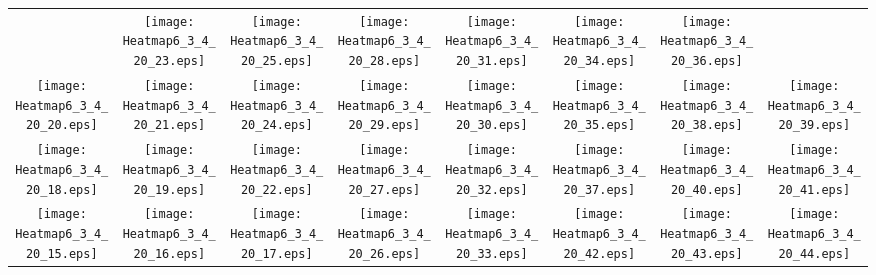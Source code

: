 \documentclass{standalone}
\begin{document}
\renewcommand{\arraystretch}{0}
\setlength{\tabcolsep}{0pt}
\begin{tabular}{ *8{c} }
 & \texttt{[image: Heatmap6\_3\_4\_20\_23.eps]} & \texttt{[image: Heatmap6\_3\_4\_20\_25.eps]} & \texttt{[image: Heatmap6\_3\_4\_20\_28.eps]} & \texttt{[image: Heatmap6\_3\_4\_20\_31.eps]} & \texttt{[image: Heatmap6\_3\_4\_20\_34.eps]} & \texttt{[image: Heatmap6\_3\_4\_20\_36.eps]} &  \\
\texttt{[image: Heatmap6\_3\_4\_20\_20.eps]} & \texttt{[image: Heatmap6\_3\_4\_20\_21.eps]} & \texttt{[image: Heatmap6\_3\_4\_20\_24.eps]} & \texttt{[image: Heatmap6\_3\_4\_20\_29.eps]} & \texttt{[image: Heatmap6\_3\_4\_20\_30.eps]} & \texttt{[image: Heatmap6\_3\_4\_20\_35.eps]} & \texttt{[image: Heatmap6\_3\_4\_20\_38.eps]} & \texttt{[image: Heatmap6\_3\_4\_20\_39.eps]} \\
\texttt{[image: Heatmap6\_3\_4\_20\_18.eps]} & \texttt{[image: Heatmap6\_3\_4\_20\_19.eps]} & \texttt{[image: Heatmap6\_3\_4\_20\_22.eps]} & \texttt{[image: Heatmap6\_3\_4\_20\_27.eps]} & \texttt{[image: Heatmap6\_3\_4\_20\_32.eps]} & \texttt{[image: Heatmap6\_3\_4\_20\_37.eps]} & \texttt{[image: Heatmap6\_3\_4\_20\_40.eps]} & \texttt{[image: Heatmap6\_3\_4\_20\_41.eps]} \\
\texttt{[image: Heatmap6\_3\_4\_20\_15.eps]} & \texttt{[image: Heatmap6\_3\_4\_20\_16.eps]} & \texttt{[image: Heatmap6\_3\_4\_20\_17.eps]} & \texttt{[image: Heatmap6\_3\_4\_20\_26.eps]} & \texttt{[image: Heatmap6\_3\_4\_20\_33.eps]} & \texttt{[image: Heatmap6\_3\_4\_20\_42.eps]} & \texttt{[image: Heatmap6\_3\_4\_20\_43.eps]} & \texttt{[image: Heatmap6\_3\_4\_20\_44.eps]} \\

\end{tabular}
\end{document}
